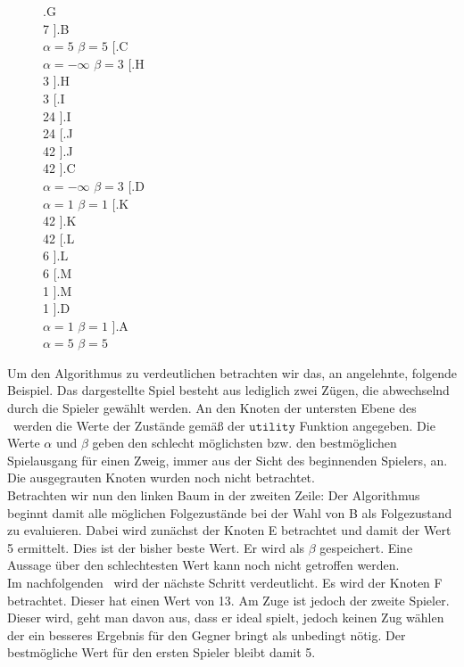 \begin{figure}[ht!]
		[.{G\\7} ].{G\\7} 
	].{B\\$\alpha = 5$ $\beta = 5$} 
	[.{C\\$\alpha = -\infty$ $\beta = 3$} 
		[.{H\\3} ].{H\\3}
		[.{I\\\color{grey}24} ].{I\\\color{grey}24}
		[.{J\\\color{grey}42} ].{J\\\color{grey}42} 
	].{C\\$\alpha = -\infty$ $\beta = 3$}
	[.{D\\$\alpha = 1$ $\beta = 1$} 
		[.{K\\42} ].{K\\42}
		[.{L\\6} ].{L\\6}
		[.{M\\1} ].{M\\1} 
	].{D\\$\alpha = 1$ $\beta = 1$}  
].{A\\$\alpha = 5$ $\beta = 5$}
\end{figure}
Um den Algorithmus zu verdeutlichen betrachten wir das, an \cite{Russell.2016} angelehnte, folgende Beispiel. Das dargestellte Spiel besteht aus lediglich zwei Zügen, die abwechselnd durch die Spieler gewählt werden. An den Knoten der untersten Ebene des \gtree\ werden die Werte der Zustände gemäß der $\mathtt{utility}$ Funktion angegeben. Die Werte $\alpha$ und $\beta$ geben den schlecht möglichsten bzw. den bestmöglichen Spielausgang für einen Zweig, immer aus der Sicht des beginnenden Spielers, an. Die ausgegrauten Knoten wurden noch nicht betrachtet.\\
Betrachten wir nun den linken Baum in der zweiten Zeile: Der Algorithmus beginnt damit alle möglichen Folgezustände bei der Wahl von B als Folgezustand zu evaluieren. Dabei wird zunächst der Knoten E betrachtet und damit der Wert 5 ermittelt. Dies ist der bisher beste Wert. Er wird als $\beta$ gespeichert. Eine Aussage über den schlechtesten Wert kann noch nicht getroffen werden.\\
Im nachfolgenden \gtree\ wird der nächste Schritt verdeutlicht. Es wird der Knoten F betrachtet. Dieser hat einen Wert von 13. Am Zuge ist jedoch der zweite Spieler. Dieser wird, geht man davon aus, dass er ideal spielt, jedoch keinen Zug wählen der ein besseres Ergebnis für den Gegner bringt als unbedingt nötig. Der bestmögliche Wert für den ersten Spieler bleibt damit 5.\\
